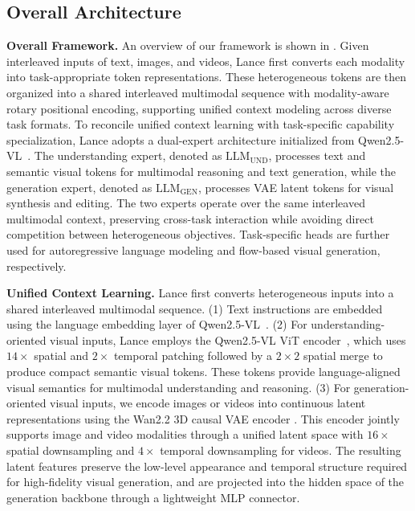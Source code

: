 \subsection{Overall Architecture}

\textbf{Overall Framework.}
An overview of our framework is shown in . 
Given interleaved inputs of text, images, and videos, Lance first converts each modality into task-appropriate token representations. These heterogeneous tokens are then organized into a shared interleaved multimodal sequence with modality-aware rotary positional encoding, supporting unified context modeling across diverse task formats.
To reconcile unified context learning with task-specific capability specialization, Lance adopts a dual-expert architecture initialized from Qwen2.5-VL~\cite{Qwen2.5-VL}. The understanding expert, denoted as $\mathrm{LLM}_{\mathrm{UND}}$, processes text and semantic visual tokens for multimodal reasoning and text generation, while the generation expert, denoted as $\mathrm{LLM}_{\mathrm{GEN}}$, processes VAE latent tokens for visual synthesis and editing. The two experts operate over the same interleaved multimodal context, preserving cross-task interaction while avoiding direct competition between heterogeneous objectives. 
Task-specific heads are further used for autoregressive language modeling and flow-based visual generation, respectively.


\textbf{Unified Context Learning.}
Lance first converts heterogeneous inputs into a shared interleaved multimodal sequence. (1) Text instructions are embedded using the language embedding layer of Qwen2.5-VL~\cite{Qwen2.5-VL}. (2) For understanding-oriented visual inputs, Lance employs the Qwen2.5-VL ViT encoder~\cite{Qwen2.5-VL}, which uses $14\times$ spatial and $2\times$ temporal patching followed by a $2\times2$ spatial merge to produce compact semantic visual tokens. These tokens provide language-aligned visual semantics for multimodal understanding and reasoning. (3) For generation-oriented visual inputs, we encode images or videos into continuous latent representations using the Wan2.2 3D causal VAE encoder \cite{wan2025wan}. This encoder jointly supports image and video modalities through a unified latent space with $16\times$ spatial downsampling and $4\times$ temporal downsampling for videos.
 The resulting latent features preserve the low-level appearance and temporal structure required for high-fidelity visual generation, and are projected into the hidden space of the generation backbone through a lightweight MLP connector.

